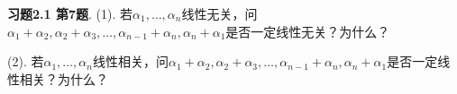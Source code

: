 
\renewcommand{\newpageorvspace}{\vspace{2em}}

\date{2022-10-待定  第三次习题课}
\author{}



\maketitle


{\bf 习题2.1 第7题}. (1). 若$\alpha_1, \ldots, \alpha_n$线性无关，问$\alpha_1 + \alpha_2, \alpha_2 + \alpha_3, \ldots, \alpha_{n-1} + \alpha_n, \alpha_n + \alpha_1$是否一定线性无关？为什么？

(2). 若$\alpha_1, \ldots, \alpha_n$线性相关，问$\alpha_1 + \alpha_2, \alpha_2 + \alpha_3, \ldots, \alpha_{n-1} + \alpha_n, \alpha_n + \alpha_1$是否一定线性相关？为什么？

\newpageorvspace

